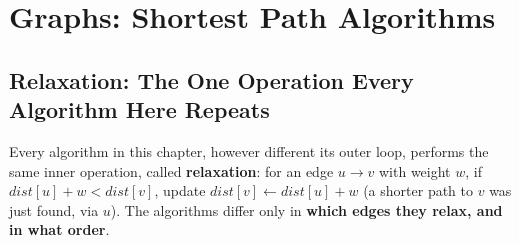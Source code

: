 \chapter{Graphs: Shortest Path Algorithms}

\section{Relaxation: The One Operation Every Algorithm Here Repeats}
\label{sec:graph-shortest-path-intro}

Every algorithm in this chapter, however different its outer loop,
performs the same inner operation, called \textbf{relaxation}: for an
edge $u \to v$ with weight $w$, if
$\textit{dist}[u] + w < \textit{dist}[v]$, update
$\textit{dist}[v] \gets \textit{dist}[u] + w$ (a shorter path to $v$
was just found, via $u$). The algorithms differ only in \textbf{which
edges they relax, and in what order}.

